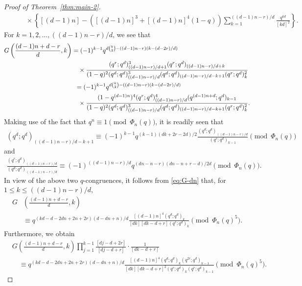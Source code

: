 \documentclass[12pt]{article}
\numberwithin{equation}{section}
\begin{document}
\begin{proof}[Proof of Theorem~\ref{thm:main-2}]
\begin{align}
    &\hspace{2em}\times\left\{[(d-1)n]-([(d-1)n]^3+[(d-1)n]^4(1-q))
    \sum_{k=1}^{((d-1)n-r)/d}\frac{q^{kd}}{[kd]^2}\right\}.
\end{align}
For $k=1,2,\dots,((d-1)n-r)/d$, we see that 
\begin{align}\label{eq:G-dn}
    G\left(\frac{(d-1)n+d-r}{d},k\right)&=(-1)^{k-1}q^{d\binom{k}{2}-((d-1)n-r)(k-(d-2r)/d)}\nonumber\\
    &\hspace{1em}\times\frac{(q^r;q^d)^3_{((d-1)n-r)/d+1}(q^r;q^d)_{((d-1)n-r)/d+k}}
    {(1-q)^2(q^d;q^d)^3_{((d-1)n-r)/d}(q^d;q^d)_{((d-1)n-r)/d-k+1}(q^r;q^d)_k^2}\nonumber\\
    &\hspace{0.5em}=(-1)^{k-1}q^{d\binom{k}{2}-((d-1)n-r)(k-(d-2r)/d)}\nonumber\\
    &\hspace{1em}\times\frac{(1-q^{(d-1)n})^4(q^r;q^d)^4_{((d-1)n-r)/d}(q^{(d-1)n+d};q^d)_{k-1}}
    {(1-q)^2(q^d;q^d)^3_{((d-1)n-r)/d}(q^d;q^d)_{((d-1)n-r)/d-k+1}(q^r;q^d)^2_k}.
\end{align}
Making use of the fact that $q^n\equiv 1 \pmod{\Phi_n(q)}$, it is readily seen that
\begin{align*}
    (q^d;q^d)_{((d-1)n-r)/d-k+1}\equiv (-1)^{k-1}q^{(k-1)(dk+2r-2d)/2}\frac{(q^d;q^d)_{((d-1)n-r)/d}}{(q^r;q^d)_{k-1}}\pmod{\Phi_n(q)}
\end{align*}
and 
\begin{align*}
    \frac{(q^r;q^d)_{((d-1)n-r)/d}}{(q^d;q^d)_{((d-1)n-r)/d}}\equiv (-1)^{((d-1)n-r)/d}q^{(dn-n-r)(dn-n+r-d)/2d}\pmod{\Phi_n(q)}.
\end{align*}
In view of the above two $q$-congruences, it follows from \eqref{eq:G-dn} that, for $1\leqslant k\leqslant((d-1)n-r)/d$,
\begin{align*}
    G&\left(\frac{(d-1)n+d-r}{d},k\right)\\
    &\equiv q^{(kd-d-2dn+2n+2r)(d-dn+n)/d}\frac{[(d-1)n]^4(q^d;q^d)_{k}}{[dk][dk-d+r](q^r;q^d)_{k}}\pmod{\Phi_n(q)^5}.
\end{align*}
Furthermore, we obtain
\begin{align}\label{eq:G-dn-final}
    &G\left(\frac{(d-1)n+d-r}{d},k\right)\prod_{j=1}^{k-1}\frac{[dj-d+2r]}{[dj-d+r]}\cdot\frac{1}{[dk-d+r]}\nonumber\\
    &\hspace{1em}\equiv q^{(kd-d-2dn+2n+2r)(d-dn+n)/d}\frac{[(d-1)n]^4(q^d;q^d)_{k}(q^{2r};q^d)_{k-1}}{[dk][dk-d+r]^2(q^r;q^d)_{k}(q^r;q^d)_{k-1}}\pmod{\Phi_n(q)^5}.

\end{align}
\end{proof}
\end{document}
